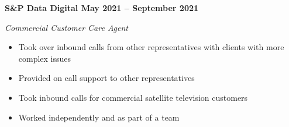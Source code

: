 \vspace{0.1cm}
\textbf{S&P Data Digital \hfill May 2021 -- September 2021} \par
\textit{Commercial Customer Care Agent} \par
\begin{itemize}
	\item Took over inbound calls from other representatives with clients with more complex issues
    \item Provided on call support to other representatives
    \item Took inbound calls for commercial satellite television customers
    \item Worked independently and as part of a team
\end{itemize} \par